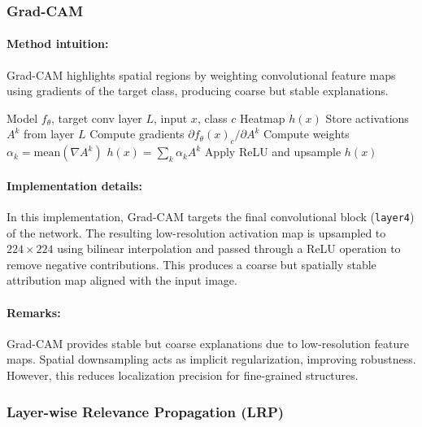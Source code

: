 \documentclass[11pt]{article}
\begin{document}
\subsubsection{Grad-CAM}

\paragraph{Method intuition:}
Grad-CAM highlights spatial regions by weighting convolutional feature maps using gradients of the target class, producing coarse but stable explanations.

\begin{algorithm}[H]
\caption{Grad-CAM}
\label{alg:gradcam}
\begin{algorithmic}[1]
\REQUIRE Model $f_\theta$, target conv layer $L$, input $x$, class $c$
\ENSURE Heatmap $h(x)$
\STATE Store activations $A^k$ from layer $L$
\STATE Compute gradients $\partial f_\theta(x)_c / \partial A^k$
\STATE Compute weights $\alpha_k = \text{mean}(\nabla A^k)$
\STATE $h(x) = \sum_k \alpha_k A^k$
\STATE Apply ReLU and upsample
\RETURN $h(x)$
\end{algorithmic}
\end{algorithm}

\paragraph{Implementation details:}
In this implementation, Grad-CAM targets the final convolutional block (\texttt{layer4}) of the network. The resulting low-resolution activation map is upsampled to $224 \times 224$ using bilinear interpolation and passed through a ReLU operation to remove negative contributions. This produces a coarse but spatially stable attribution map aligned with the input image.

\paragraph{Remarks:}
Grad-CAM provides stable but coarse explanations due to low-resolution feature maps. Spatial downsampling acts as implicit regularization, improving robustness. However, this reduces localization precision for fine-grained structures.

\subsubsection{Layer-wise Relevance Propagation (LRP)}
\end{document}
